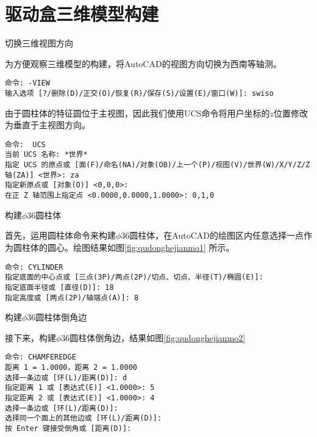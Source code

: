 \section{驱动盒三维模型构建}
\begin{procedure}
\item 切换三维视图方向

为方便观察三维模型的构建，将AutoCAD的视图方向切换为西南等轴测。
\begin{lstlisting}
命令: -VIEW
输入选项 [?/删除(D)/正交(O)/恢复(R)/保存(S)/设置(E)/窗口(W)]: swiso
\end{lstlisting}

由于圆柱体的特征圆位于主视图，因此我们使用UCS命令将用户坐标的$z$位置修改为垂直于主视图方向。

\begin{lstlisting}
命令:  UCS
当前 UCS 名称: *世界*
指定 UCS 的原点或 [面(F)/命名(NA)/对象(OB)/上一个(P)/视图(V)/世界(W)/X/Y/Z/Z 轴(ZA)] <世界>: za
指定新原点或 [对象(O)] <0,0,0>:
在正 Z 轴范围上指定点 <0.0000,0.0000,1.0000>: 0,1,0
\end{lstlisting}

\begin{figure}[htbp]
\centering
\begin{floatrow}[2]
\end{floatrow}
\end{figure}

\item 构建$\phi 36$圆柱体

首先，运用圆柱体命令来构建$\phi 36$圆柱体，在AutoCAD的绘图区内任意选择一点作为圆柱体的圆心。绘图结果如图\ref{fig:qudonghejianmo1} 所示。

\begin{lstlisting}
命令: CYLINDER
指定底面的中心点或 [三点(3P)/两点(2P)/切点、切点、半径(T)/椭圆(E)]:
指定底面半径或 [直径(D)]: 18
指定高度或 [两点(2P)/轴端点(A)]: 8
\end{lstlisting}

\item 构建$\phi 36$圆柱体倒角边

接下来，构建$\phi 36$圆柱体倒角边，结果如图\ref{fig:qudonghejianmo2}
\begin{lstlisting}
命令: CHAMFEREDGE
距离 1 = 1.0000，距离 2 = 1.0000
选择一条边或 [环(L)/距离(D)]: d
指定距离 1 或 [表达式(E)] <1.0000>: 5
指定距离 2 或 [表达式(E)] <1.0000>: 4
选择一条边或 [环(L)/距离(D)]:
选择同一个面上的其他边或 [环(L)/距离(D)]:
按 Enter 键接受倒角或 [距离(D)]:
\end{lstlisting}


\end{procedure}
